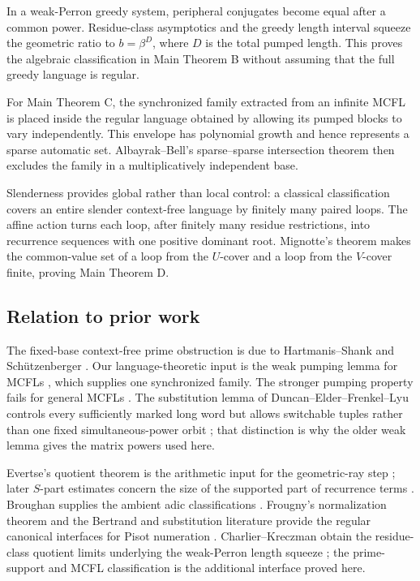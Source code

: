 In a weak-Perron greedy system, peripheral conjugates become equal after a
common power. Residue-class asymptotics and the greedy length interval
squeeze the geometric ratio to \(b=\beta^D\), where \(D\) is the total
pumped length. This proves the algebraic classification in Main Theorem B
without assuming that the full greedy language is regular.

For Main Theorem C, the synchronized family extracted from an infinite
MCFL is placed inside the regular language obtained by allowing its pumped
blocks to vary independently. This envelope has polynomial growth and hence
represents a sparse automatic set. Albayrak--Bell's sparse--sparse
intersection theorem then excludes the family in a multiplicatively
independent base.

Slenderness provides global rather than local control: a classical
classification covers an entire slender context-free language by finitely
many paired loops. The affine action
turns each loop, after finitely many residue restrictions, into recurrence
sequences with one positive dominant root. Mignotte's theorem makes the
common-value set of a loop from the \(U\)-cover and a loop from the
\(V\)-cover finite, proving Main Theorem D.

\subsection{Relation to prior work}

The fixed-base context-free prime obstruction is due to Hartmanis--Shank
and Sch\"utzenberger \cite{HartmanisShank1968,Schutzenberger1968}. Our
language-theoretic input is the weak pumping lemma for MCFLs
\cite[Lemma~3.2]{SekiEtAl1991}, which supplies one synchronized family.
The stronger pumping property fails for general MCFLs
\cite{KanazawaKobeleMichaelisSalvatiYoshinaka2014}. The substitution lemma
of Duncan--Elder--Frenkel--Lyu controls every sufficiently marked long word
but allows switchable tuples rather than one fixed simultaneous-power
orbit \cite[Theorem~4.5]{DuncanElderFrenkelLiu2026}; that distinction is
why the older weak lemma gives the matrix powers used here.

Evertse's quotient theorem is the arithmetic input for the geometric-ray
step \cite[Theorem~3]{Evertse1984}; later \(S\)-part estimates concern the
size of the supported part of recurrence terms
\cite{BugeaudEvertse2017}. Broughan supplies the ambient adic
classifications \cite{Broughan2003}. Frougny's normalization theorem and
the Bertrand and substitution literature provide the regular canonical
interfaces for Pisot numeration
\cite{Frougny1992,BruyereHansel1997,Fabre1995,FrougnySolomyak1992}.
Charlier--Kreczman obtain the residue-class quotient limits underlying the
weak-Perron length squeeze \cite[Proposition~10 and Remark~12]{CharlierKreczman2025};
the prime-support and MCFL classification is the additional interface
proved here.

